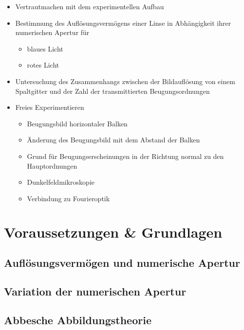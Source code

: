 \documentclass[12pt,a4paper,twoside]{article}
\begin{document}
\begin{itemize}
    \item Vertrautmachen mit dem experimentellen Aufbau
    \item Bestimmung des Auflösungsvermögens einer Linse in Abhängigkeit ihrer numerischen Apertur für
    \begin{itemize}
        \item blaues Licht
        \item rotes Licht
    \end{itemize}
    \item Untersuchung des Zusammenhangs zwischen der Bildauflösung von einem Spaltgitter und der Zahl der transmittierten Beugungsordnungen
    \item  Freies Experimentieren
    \begin{itemize}
        \item Beugungsbild horizontaler Balken
        \item Änderung des Beugungsbild mit dem Abstand der Balken
        \item Grund für Beugungserscheinungen in der Richtung normal zu den Hauptordnungen
        \item Dunkelfeldmikroskopie
        \item Verbindung zu Fourieroptik
    \end{itemize}
\end{itemize}



\section{Voraussetzungen \& Grundlagen} %

\subsection{Auflösungsvermögen und numerische Apertur}


\subsection{Variation der numerischen Apertur}


\subsection{Abbesche Abbildungstheorie}
\end{document}
